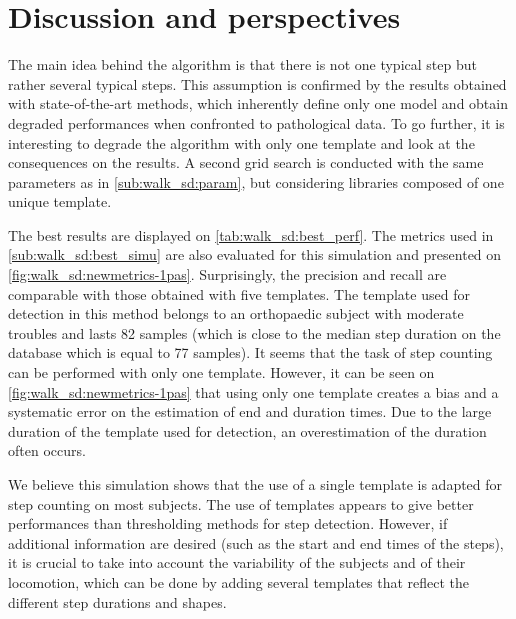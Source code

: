 \documentclass[../thesis.tex]{subfiles}
\begin{document}
\section{Discussion and perspectives}
\label{sec:walk_sd:discussion}


The main idea behind the algorithm is that there is not one typical step but rather several typical steps. This assumption is confirmed by the results obtained with state-of-the-art methods, which inherently define only one model and obtain degraded performances when confronted to pathological data. To go further,  it is interesting to degrade the algorithm with only one template and look at the consequences on the results. A second grid search is conducted with the same parameters as in \autoref{sub:walk_sd:param}, but  considering libraries composed of one unique template.

The best results are displayed on \autoref{tab:walk_sd:best_perf}. The metrics used in \autoref{sub:walk_sd:best_simu} are also evaluated for this simulation and presented on \autoref{fig:walk_sd:newmetrics-1pas}. Surprisingly, the precision and recall are comparable with those obtained with five templates. The template used for detection in this method belongs to an orthopaedic subject with moderate troubles and lasts 82 samples (which is close to the median step duration on the database which is equal to 77 samples). It seems that the task of step counting can be performed with only one template. However, it can be seen on \autoref{fig:walk_sd:newmetrics-1pas} that using only one template creates a bias and a systematic error on the estimation of end and duration times. Due to the large duration of the template used for detection, an overestimation of the duration often occurs.

We believe this simulation shows that the use of a single template is adapted for step counting  on most subjects. The use of templates appears to give better performances than thresholding methods for step detection.  However, if additional information are desired (such as the start and end times of the steps), it is crucial to take into account the variability of the subjects and of their locomotion, which can be done by adding several templates that reflect the different step durations and shapes.
\end{document}
